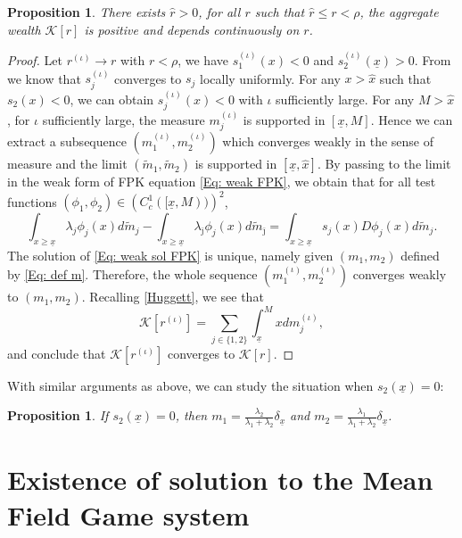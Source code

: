 \documentclass[11pt]{article}
\numberwithin{equation}{section}
\newtheorem{prop}[thm]{Proposition}
\theoremstyle{definition}
\def\i{{(\iota)}}
\newcommand{\ux}{{\underline x}}
\theoremstyle{plain}
\begin{document}
\begin{prop}\label{Prop: Kr}
 There exists $\hat{r}>0$, for all $r$ such that $\hat{r}\leq r< \rho$, the aggregate wealth $\mathcal{K}[r]$ is positive and depends continuously on $r$. 
\end{prop}
\begin{proof}
Let $r^\i \to r$ with $r< \rho$, we have $s^\i _1(x)<0$ and $s^\i_2(\ux)>0$. From  we know that $s^\i_j$ converges to $s_j$ locally uniformly. For any $x> \widehat{x}$ such that $s_2(x)<0$, we can obtain $s^\i_j(x)<0$ with $\iota$ sufficiently large. For any $M>\widehat{x}$, for $\iota$ sufficiently large, the measure $m^\i_j$ is supported in $[\ux,M]$. Hence we can extract a subsequence $(m^\i_1,m^\i_2)$ which converges weakly in the sense of measure and {the limit $(\tilde{m}_1,\tilde{m}_2)$ is supported in $[\ux,\widehat{x}]$.} By passing to the limit in the weak form of FPK equation \cref{Eq: weak FPK}, we obtain that for all test functions $(\phi_1,\phi_2)\in \left(C_c^1([\ux,M))\right)^2$,
\begin{equation}\label{Eq: weak sol FPK}
\int_{x\geq \ux}\lambda_j \phi_j(x)d\tilde{m}_j-\int_{x\geq \ux}\lambda_{\bar \jmath}\phi_j(x)d\tilde{m}_{\bar \jmath}=\int_{x\geq \ux}s_j(x)D\phi_j(x)d\tilde{m}_j.
\end{equation}
The solution of \cref{Eq: weak sol FPK} is unique, namely given $(m_1,m_2)$ defined by \cref{Eq: def m}. Therefore, the whole sequence $(m^\i_1,m^\i_2)$ converges weakly to $(m_1,m_2)$. Recalling \cref{Huggett}, we see that 
$$
\mathcal{K}[r^\i]=\sum_{j\in \{1,2\}}\int_{\ux}^Mxdm^\i_j,
$$
and conclude that $\mathcal{K}[r^\i]$ converges to $\mathcal{K}[r]$.
\end{proof}
With similar arguments as above, we can study the situation when $s_2(\underline{x})= 0$:
\begin{prop}
If $s_2(\underline x)=0$, then $m_1= \frac {\lambda_2}{\lambda_1+\lambda_2} \delta_{\underline x}$ and $m_2= \frac {\lambda_1}{\lambda_1+\lambda_2} \delta_{\underline x}$.
\end{prop}
\section{Existence of solution to the Mean Field Game system}\label{Sec: MFG}
\end{document}
